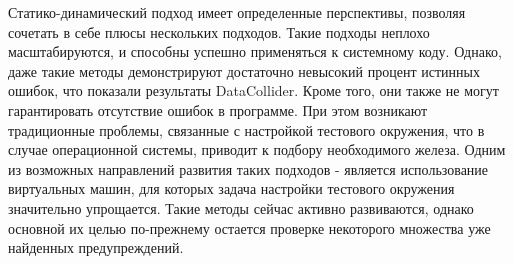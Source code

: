 Статико-динамический подход имеет определенные перспективы, позволяя сочетать в себе плюсы нескольких подходов.
Такие подходы неплохо масштабируются, и способны успешно применяться к системному коду.
Однако, даже такие методы демонстрируют достаточно невысокий процент истинных ошибок, что показали результаты DataCollider.
Кроме того, они также не могут гарантировать отсутствие ошибок в программе.
При этом возникают традиционные проблемы, связанные с настройкой тестового окружения, что в случае операционной системы, приводит к подбору необходимого железа.
Одним из возможных направлений развития таких подходов - является использование виртуальных машин, для которых задача настройки тестового окружения значительно упрощается. 
Такие методы сейчас активно развиваются, однако основной их целью по-прежнему остается проверке некоторого множества уже найденных предупреждений.



